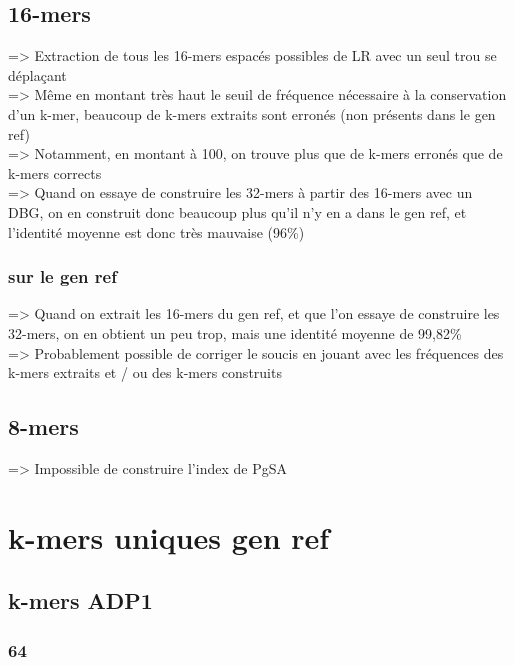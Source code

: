 \documentclass[12pt]{article}
\begin{document}
\subsection{16-mers}

=> Extraction de tous les 16-mers espacés possibles de LR avec un seul trou se déplaçant \\

=> Même en montant très haut le seuil de fréquence nécessaire à la conservation d'un k-mer,
beaucoup de k-mers extraits sont erronés (non présents dans le gen ref) \\
=> Notamment, en montant à 100, on trouve plus que de k-mers erronés que de k-mers corrects \\

=> Quand on essaye de construire les 32-mers à partir des 16-mers avec un DBG, on en construit
donc beaucoup plus qu'il n'y en a dans le gen ref, et l'identité moyenne est donc très mauvaise (96\%)

\subsubsection{sur le gen ref}

=> Quand on extrait les 16-mers du gen ref, et que l'on essaye de construire les 32-mers,
on en obtient un peu trop, mais une identité moyenne de 99,82\% \\

=> Probablement possible de corriger le soucis en jouant avec les fréquences des k-mers extraits
et / ou des k-mers construits

\subsection{8-mers}

=> Impossible de construire l'index de PgSA

\section{k-mers uniques gen ref}

\subsection{k-mers ADP1}

\subsubsection{64}
\end{document}

